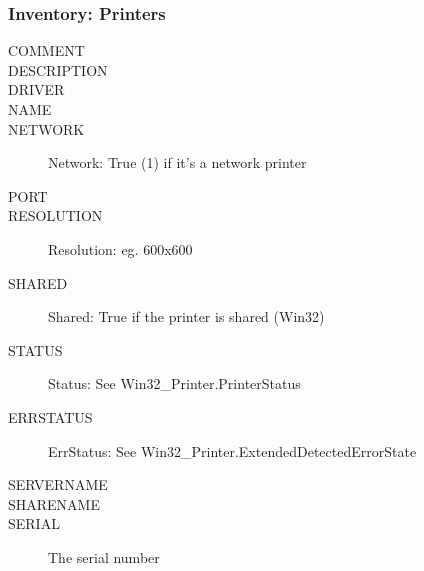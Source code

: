 \documentclass{beamer}
\begin{document}
\begin{frame}
\frametitle{Inventory: Printers}
\begin{description}
      \item[COMMENT]
      \item[DESCRIPTION]
      \item[DRIVER]
      \item[NAME]
      \item[NETWORK] Network: True (1) if it's a network printer
      \item[PORT]
      \item[RESOLUTION] Resolution: eg. 600x600
      \item[SHARED] Shared: True if the printer is shared (Win32)
      \item[STATUS] Status: See Win32\_Printer.PrinterStatus
      \item[ERRSTATUS] ErrStatus: See Win32\_Printer.ExtendedDetectedErrorState
      \item[SERVERNAME]
      \item[SHARENAME]
      \item[SERIAL] The serial number
\end{description}
\end{frame}
\end{document}
